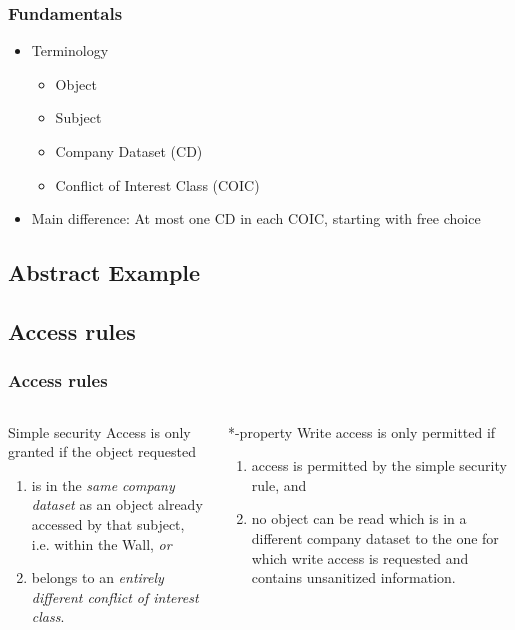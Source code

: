 \documentclass[10pt]{beamer}
\begin{document}
\begin{frame}
	\frametitle{Fundamentals}
	
	\begin{itemize}
		\item Terminology
		\begin{itemize}
			\item Object
			\item Subject
			\item Company Dataset (CD)
			\item Conflict of Interest Class (COIC)
		\end{itemize}
		\item Main difference: At most one CD in each COIC, starting with free choice
	\end{itemize}
\end{frame}

\subsection{Abstract Example}
\begin{frame}
	
\end{frame}

\subsection{Access rules}
\begin{frame}
	\frametitle{Access rules}
	
	\begin{columns}
		\begin{column}{.45\textwidth}
			\begin{block}{Simple security}
				Access is only granted if the object requested
				\begin{enumerate}
					\item is in the \textit{same company dataset} as an object already accessed by that subject, i.e. within the Wall, \textit{or}
					\item belongs to an \textit{entirely different conflict of interest class}.
				\end{enumerate}
			\end{block}
		\end{column}
		\begin{column}{.45\textwidth}
			\begin{block}{*-property}
				Write access is only permitted if
				\begin{enumerate}
					\item access is permitted by the simple security rule, and
					\item no object can be read which is in a different company dataset to the one for which write access is requested and contains unsanitized information.
				\end{enumerate}
			\end{block}
		\end{column}
	\end{columns}
\end{frame}


{\aauwavesbg
\begin{frame}
\end{frame}}
\end{document}
